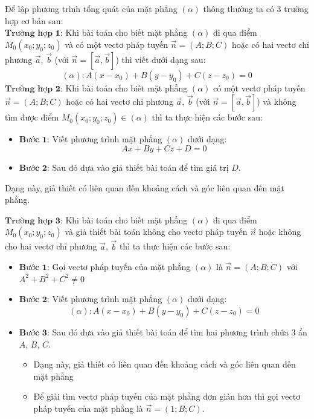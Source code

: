 Để lập phương trình tổng quát của mặt phẳng $\left(\alpha\right)$ thông thường ta có 3 trường hợp cơ bản sau:\\
$\textbf{Trường hợp 1:}$ Khi bài toán cho biết mặt phẳng $\left(\alpha\right)$ đi qua điểm $M_0 \left(x_0;y_0;z_0\right)$ và có một vectơ pháp tuyến $\overrightarrow{n} = \left(A;B;C\right)$ hoặc có hai vectơ chỉ phương $\overrightarrow{a}$, $\overrightarrow{b}$ (với $\overrightarrow{n} = \left[\overrightarrow{a},\overrightarrow{b}\right]$) thì viết dưới dạng sau:
$$\left(\alpha\right) \colon A\left(x-x_0\right)+B\left(y-y_0\right)+C\left(z-z_0\right)=0$$
$\textbf{Trường hợp 2:}$ Khi bài toán cho biết mặt phẳng $\left(\alpha\right)$ có một vectơ pháp tuyến $\overrightarrow{n} = \left(A;B;C\right)$ hoặc có hai vectơ chỉ phương $\overrightarrow{a}$, $\overrightarrow{b}$ (với $\overrightarrow{n} = \left[\overrightarrow{a},\overrightarrow{b}\right]$) và không tìm được điểm $M_0 \left(x_0;y_0;z_0\right) \in \left(\alpha\right)$ thì ta thực hiện các bước sau:
\begin{itemize}
\item $\textbf{Bước 1:}$ Viết phương trình mặt phẳng $\left(\alpha\right)$ dưới dạng:
$$Ax+By+Cz+D=0$$
\item $\textbf{Bước 2:}$ Sau đó dựa vào giả thiết bài toán để tìm giá trị $D$.
\end{itemize}
\begin{note}
Dạng này, giả thiết có liên quan đến khoảng cách và góc liên quan đến mặt phẳng.
\end{note}
$\textbf{Trường hợp 3:}$ Khi bài toán cho biết mặt phẳng $\left(\alpha\right)$ đi qua điểm $M_0 \left(x_0;y_0;z_0\right)$ và giả thiết bài toán không cho vectơ pháp tuyến $\overrightarrow{n}$ hoặc không cho hai vectơ chỉ phương $\overrightarrow{a}$, $\overrightarrow{b}$ thì ta thực hiện các bước sau:
\begin{itemize}
\item $\textbf{Bước 1:}$ Gọi vectơ pháp tuyến của mặt phẳng $\left(\alpha\right)$ là $\overrightarrow{n} = \left(A;B;C\right)$ với $A^2+B^2+C^2 \neq 0$
\item $\textbf{Bước 2:}$ Viết phương trình mặt phẳng $\left(\alpha\right)$ dưới dạng:
$$\left(\alpha\right) \colon A\left(x-x_0\right)+B\left(y-y_0\right)+C\left(z-z_0\right)=0$$
\item $\textbf{Bước 3:}$ Sau đó dựa vào giả thiết bài toán để tìm hai phương trình chứa $3$ ẩn $A$, $B$, $C$.
\begin{note}
\begin{itemize}
\item Dạng này, giả thiết có liên quan đến khoảng cách và góc liên quan đến mặt phẳng
\item Để giải tìm vectơ pháp tuyến của mặt phẳng đơn giản hơn thì gọi vectơ pháp tuyến của mặt phẳng là $\overrightarrow{n} = \left(1;B;C\right)$.
\end{itemize}
\end{note}
\end{itemize}

